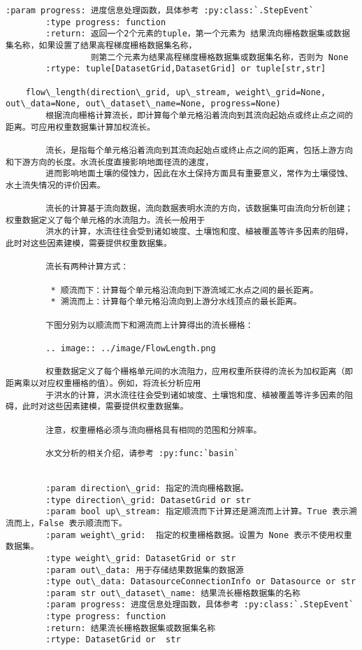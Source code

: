 \documentclass[11pt]{article}
\begin{document}
\begin{Verbatim}[commandchars=\\\{\}]
        :param progress: 进度信息处理函数，具体参考 :py:class:`.StepEvent`
        :type progress: function
        :return: 返回一个2个元素的tuple，第一个元素为 结果流向栅格数据集或数据集名称，如果设置了结果高程梯度栅格数据集名称，
                 则第二个元素为结果高程梯度栅格数据集或数据集名称，否则为 None
        :rtype: tuple[DatasetGrid,DatasetGrid] or tuple[str,str]
    
    flow\_length(direction\_grid, up\_stream, weight\_grid=None, out\_data=None, out\_dataset\_name=None, progress=None)
        根据流向栅格计算流长，即计算每个单元格沿着流向到其流向起始点或终止点之间的距离。可应用权重数据集计算加权流长。
        
        流长，是指每个单元格沿着流向到其流向起始点或终止点之间的距离，包括上游方向和下游方向的长度。水流长度直接影响地面径流的速度，
        进而影响地面土壤的侵蚀力，因此在水土保持方面具有重要意义，常作为土壤侵蚀、水土流失情况的评价因素。
        
        流长的计算基于流向数据，流向数据表明水流的方向，该数据集可由流向分析创建；权重数据定义了每个单元格的水流阻力。流长一般用于
        洪水的计算，水流往往会受到诸如坡度、土壤饱和度、植被覆盖等许多因素的阻碍，此时对这些因素建模，需要提供权重数据集。
        
        流长有两种计算方式：
        
         * 顺流而下：计算每个单元格沿流向到下游流域汇水点之间的最长距离。
         * 溯流而上：计算每个单元格沿流向到上游分水线顶点的最长距离。
        
        下图分别为以顺流而下和溯流而上计算得出的流长栅格：
        
        .. image:: ../image/FlowLength.png
        
        权重数据定义了每个栅格单元间的水流阻力，应用权重所获得的流长为加权距离（即距离乘以对应权重栅格的值）。例如，将流长分析应用
        于洪水的计算，洪水流往往会受到诸如坡度、土壤饱和度、植被覆盖等许多因素的阻碍，此时对这些因素建模，需要提供权重数据集。
        
        注意，权重栅格必须与流向栅格具有相同的范围和分辨率。
        
        水文分析的相关介绍，请参考 :py:func:`basin`
        
        
        :param direction\_grid: 指定的流向栅格数据。
        :type direction\_grid: DatasetGrid or str
        :param bool up\_stream: 指定顺流而下计算还是溯流而上计算。True 表示溯流而上，False 表示顺流而下。
        :param weight\_grid:  指定的权重栅格数据。设置为 None 表示不使用权重数据集。
        :type weight\_grid: DatasetGrid or str
        :param out\_data: 用于存储结果数据集的数据源
        :type out\_data: DatasourceConnectionInfo or Datasource or str
        :param str out\_dataset\_name: 结果流长栅格数据集的名称
        :param progress: 进度信息处理函数，具体参考 :py:class:`.StepEvent`
        :type progress: function
        :return: 结果流长栅格数据集或数据集名称
        :rtype: DatasetGrid or  str
    

\end{Verbatim}
\end{document}
